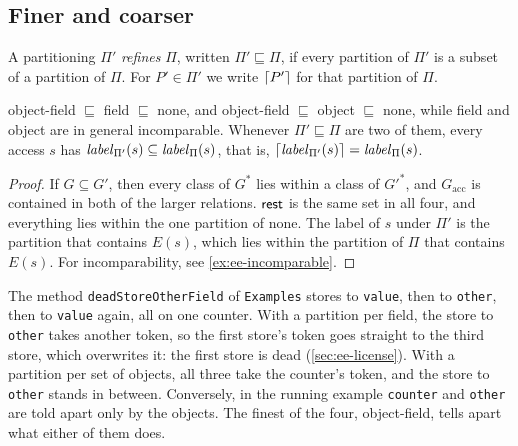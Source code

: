 \subsection{Finer and coarser}

\begin{definition}[Refinement]\label{def:ee-refinement}
A partitioning $\Pi'$ \emph{refines} $\Pi$, written $\Pi' \sqsubseteq \Pi$, if
every partition of $\Pi'$ is a subset of a partition of $\Pi$. For
$P' \in \Pi'$ we write $\lceil P' \rceil$ for that partition of $\Pi$.
\end{definition}

\begin{proposition}\label{prop:ee-order}
object-field $\sqsubseteq$ field $\sqsubseteq$ none, and object-field
$\sqsubseteq$ object $\sqsubseteq$ none, while field and object are in general
incomparable. Whenever $\Pi' \sqsubseteq \Pi$ are two of them, every access
$s$ has $\mathit{label}_{\Pi'}(s) \subseteq \mathit{label}_\Pi(s)$, that is,
$\lceil \mathit{label}_{\Pi'}(s) \rceil = \mathit{label}_\Pi(s)$.
\end{proposition}

\begin{proof}
If $G \subseteq G'$, then every class of $G^{\ast}$ lies within a class of
$G'^{\ast}$, and $G_{\mathrm{acc}}$ is contained in both of the larger relations.
$\mathsf{rest}$ is the same set in all four, and everything lies within the one
partition of none. The label of $s$ under $\Pi'$ is the partition that contains
$E(s)$, which lies within the partition of $\Pi$ that contains $E(s)$. For
incomparability, see \cref{ex:ee-incomparable}.
\end{proof}

\begin{example}\label{ex:ee-incomparable}
The method \texttt{deadStoreOtherField} of \texttt{Examples} stores to
\texttt{value}, then to \texttt{other}, then to \texttt{value} again, all on one
counter. With a partition per field, the store to \texttt{other} takes another
token, so the first store's token goes straight to the third store, which
overwrites it: the first store is dead (\cref{sec:ee-license}). With a
partition per set of objects, all three take the counter's token, and the store
to \texttt{other} stands in between. Conversely, in the running example
\texttt{counter} and \texttt{other} are told apart only by the objects. The
finest of the four, object-field, tells apart what either of them does.
\end{example}

